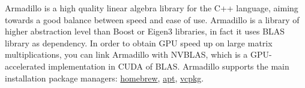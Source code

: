 Armadillo is a high quality linear algebra library for the C++ language, aiming towards a good balance between speed and ease of use. Armadillo is a library of higher abstraction level than Boost or Eigen3 libraries, in fact it uses BLAS library as dependency. In order to obtain GPU speed up on large matrix multiplications, you can link Armadillo with NVBLAS, which is a GPU-accelerated implementation in CUDA of BLAS. Armadillo supports the main installation package managers: \href{https://formulae.brew.sh/formula/armadillo}{homebrew}, \href{https://www.uio.no/studier/emner/matnat/fys/FYS4411/v13/guides/installing-armadillo}{apt}, \href{https://github.com/microsoft/vcpkg/pull/2954}{vcpkg}.

